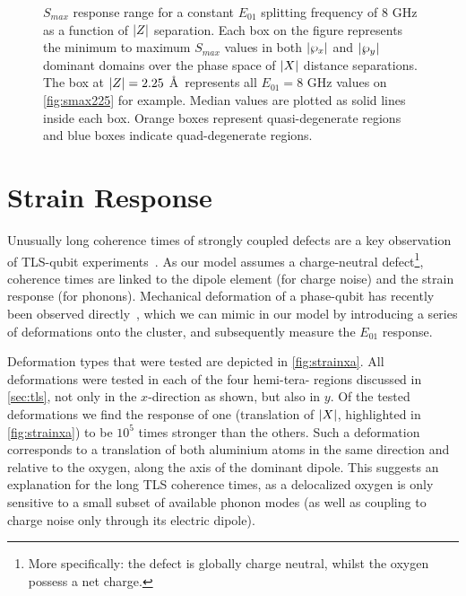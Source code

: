 \begin{figure}[htp]
\resizebox{\textwidth}{!}{}
\caption[$S_{max}$ Response Range]{\label{fig:smaxz}$S_{max}$ response range for a constant $E_{01}$ splitting frequency of $8$ GHz as a function of $\lvert Z\rvert$ separation. Each box on the figure represents the minimum to maximum $S_{max}$ values in both $\lvert\wp_{x}\rvert$ and $\lvert\wp_{y}\rvert$ dominant domains over the phase space of $\lvert X\rvert$ distance separations. The box at $\lvert Z\rvert = 2.25$ \AA\ represents all $E_{01} = 8$ GHz values on \cref{fig:smax225} for example. Median values are plotted as solid lines inside each box. Orange boxes represent quasi-degenerate regions and blue boxes indicate quad-degenerate regions.}
\end{figure}

\section{Strain Response}\label{sec:strain}

Unusually long coherence times of strongly coupled defects are a key observation of TLS-qubit experiments~\cite{Neeley2008, Lisenfeld2010a}.
As our model assumes a charge-neutral defect\footnote{More specifically: the defect is globally charge neutral, whilst the oxygen possess a net charge.}, coherence times are linked to the dipole element (for charge noise) and the strain response (for phonons).
Mechanical deformation of a phase-qubit has recently been observed directly~\cite{Grabovskij2012}, which we can mimic in our  model by introducing a series of deformations onto the cluster, and subsequently measure the $E_{01}$ response.

Deformation types that were tested are depicted in \cref{fig:strainxa}.
All deformations were tested in each of the four hemi-tera- regions discussed in \cref{sec:tls}, not only in the $x$-direction as shown, but also in $y$.
Of the tested deformations we find the response of one (translation of $\lvert X\rvert$, highlighted in \cref{fig:strainxa}) to be $10^5$ times stronger than the others.
Such a deformation corresponds to a translation of both aluminium atoms in the same direction and relative to the oxygen, along the axis of the dominant dipole.
This suggests an explanation for the long TLS coherence times, as a delocalized oxygen is only sensitive to a small subset of available phonon modes (as well as coupling to charge noise only through its electric dipole).

